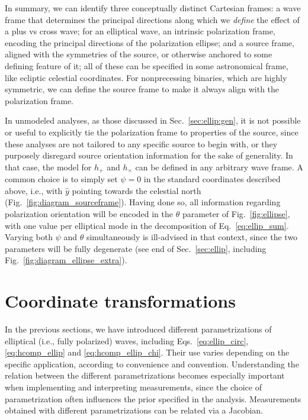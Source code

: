 \documentclass[aps,prd,twocolumn,superscriptaddress,preprintnumbers,floatfix,nofootinbib]{revtex4-2}
\newcommand*{\eq}[1]{Eq.~\eqref{eq:#1}}
\begin{document}
In summary, we can identify three conceptually distinct Cartesian frames: a wave frame that determines the principal directions along which we \emph{define} the effect of a plus vs cross wave; for an elliptical wave, an intrinsic polarization frame, encoding the principal directions of the polarization ellipse; and a source frame, aligned with the symmetries of the source, or otherwise anchored to some defining feature of it; all of these can be specified in some astronomical frame, like ecliptic celestial coordinates.
For nonprecessing binaries, which are highly symmetric, we can define the source frame to make it always align with the polarization frame.

In unmodeled analyses, as those discussed in Sec.~\ref{sec:ellip:gen}, it is not possible or useful to explicitly tie the polarization frame to properties of the source, since these analyses are not tailored to any specific source to begin with, or they purposely disregard source orientation information for the sake of generality.
In that case, the model for $h_+$ and $h_\times$ can be defined in any arbitrary wave frame.
A common choice is to simply set $\psi = 0$ in the standard coordinates described above, i.e., with $\hat{y}$ pointing towards the celestial north (Fig.~\ref{fig:diagram_sourceframe}).
Having done so, all information regarding polarization orientation will be encoded in the $\theta$ parameter of Fig.~\ref{fig:ellipse}, with one value per elliptical mode in the decomposition of \eq{ellip_sum}.
Varying both $\psi$ and $\theta$ simultaneously is ill-advised in that context, since the two parameters will be fully degenerate (see end of Sec.~\ref{sec:ellip}, including Fig.~\ref{fig:diagram_ellipse_extra}).

\section{Coordinate transformations}
\label{sec:jacobians}

In the previous sections, we have introduced different parametrizations of elliptical (i.e., fully polarized) waves, including Eqs.~\eqref{eq:ellip_circ}, \eqref{eq:hcomp_ellip} and \eqref{eq:hcomp_ellip_chi}.
Their use varies depending on the specific application, according to convenience and convention.
Understanding the relation between the different parametrizations becomes especially important when implementing and interpreting measurements, since the choice of parametrization often influences the prior specified in the analysis.
Measurements obtained with different parametrizations can be related via a Jacobian.
\end{document}
